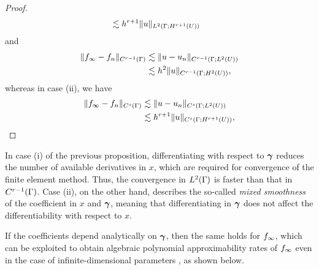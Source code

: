 \begin{proof}
\begin{equation*}
\begin{split}
		&\lesssim h^{r+1}\|u\|_{L^2(\Gamma;H^{r+1}(U))}
		\end{split}
		\end{equation*}
		and
		\begin{equation*}
		\begin{split}
		\|f_{\infty}-f_{n}\|_{C^{r-1}(\Gamma)}&\lesssim \|u-u_{n}\|_{C^{r-1}(\Gamma;L^2(U))}\\
		&\lesssim h^{2}\|u\|_{C^{r-1}(\Gamma;H^{2}(U))},
		\end{split}
		\end{equation*} 
	whereas in case (ii), we have
	\begin{equation*}
	\begin{split}
	\|f_{\infty}-f_{n}\|_{C^{s}(\Gamma)}&\lesssim \|u-u_{n}\|_{C^{s}(\Gamma;L^2(U))}\\
	&\lesssim h^{r+1}\|u\|_{C^{s}(\Gamma;H^{r+1}(U))},
	\end{split}
	\end{equation*}
\end{proof}
\begin{rem}
In case (i) of the previous proposition, differentiating with respect to $\bm{\gamma}$ reduces the number of available derivatives in $x$, which are required for convergence of the finite element method. Thus, the convergence in $L^2(\Gamma)$ is faster than that in $C^{r-1}(\Gamma)$. Case (ii), on the other hand, describes the so-called \emph{mixed smoothness} of the coefficient in $x$ and $\bm{\gamma}$, meaning that differentiating in $\bm{\gamma}$ does not affect the differentiability with respect to $x$.  
\end{rem}
If the coefficients depend analytically on $\bm{\gamma}$, then the same holds for $f_{\infty}$, which can be exploited to obtain algebraic polynomial approximability rates of $f_{\infty}$ even in the case of infinite-dimensional parameters \cite{ChkifaCohenSchwab2015,Haji-AliNobileTamelliniEtAl2015}, as shown below.

